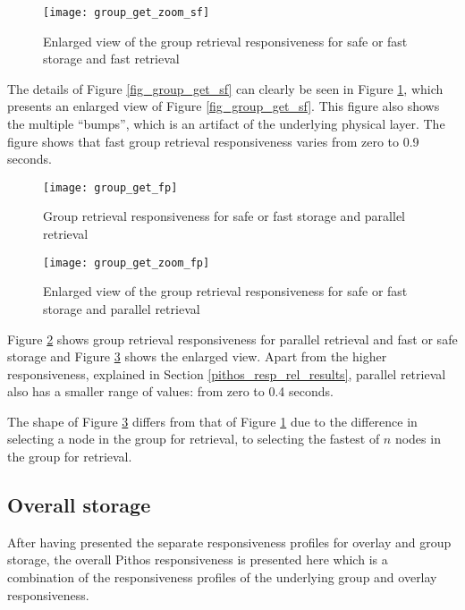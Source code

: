 \begin{figure}[htbp]
 \centering
 \texttt{[image: group\_get\_zoom\_sf]}
 \caption{Enlarged view of the group retrieval responsiveness for safe or fast storage and fast retrieval}
 \label{fig_group_get_zoom_sf}
\end{figure}
%
The details of Figure \ref{fig_group_get_sf} can clearly be seen in Figure \ref{fig_group_get_zoom_sf}, which presents an enlarged view of Figure \ref{fig_group_get_sf}. This figure also shows the multiple ``bumps'', which is an artifact of the underlying physical layer. The figure shows that fast group retrieval responsiveness varies from zero to 0.9 seconds.

\begin{figure}[htbp]
 \centering
 \texttt{[image: group\_get\_fp]}
 \caption{Group retrieval responsiveness for safe or fast storage and parallel retrieval}
 \label{fig_group_get_fp}
\end{figure}

\begin{figure}[htbp]
 \centering
 \texttt{[image: group\_get\_zoom\_fp]}
 \caption{Enlarged view of the group retrieval responsiveness for safe or fast storage and parallel retrieval}
 \label{fig_group_get_zoom_fp}
\end{figure}
%
Figure \ref{fig_group_get_fp} shows group retrieval responsiveness for parallel retrieval and fast or safe storage and Figure \ref{fig_group_get_zoom_fp} shows the enlarged view. Apart from the higher responsiveness, explained in Section \ref{pithos_resp_rel_results}, parallel retrieval also has a smaller range of values: from zero to 0.4 seconds.

The shape of Figure \ref{fig_group_get_zoom_fp} differs from that of Figure \ref{fig_group_get_zoom_sf} due to the difference in selecting a node in the group for retrieval, to selecting the fastest of $n$ nodes in the group for retrieval.

\subsection{Overall storage}

After having presented the separate responsiveness profiles for overlay and group storage, the overall Pithos responsiveness is presented here which is a combination of the responsiveness profiles of the underlying group and overlay responsiveness.

